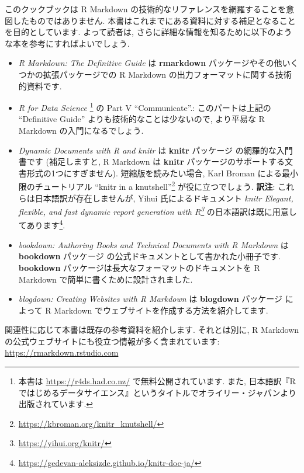 \documentclass[
  11pt,
  lualatex,ja=standard,jafont=noto]{bxjsreport}
\renewcommand{\href}[2]{#2\footnote{\url{#1}}}
\begin{document}
このクックブックは R Markdown の技術的なリファレンスを網羅することを意図したものではありません. 本書はこれまでにある資料に対する補足となることを目的としています. よって読者は, さらに詳細な情報を知るために以下のような本を参考にすればよいでしょう.

\begin{itemize}
\item
  \emph{R Markdown: The Definitive Guide} \autocite{rmarkdown2018} は \textbf{rmarkdown} パッケージやその他いくつかの拡張パッケージでの R Markdown の出力フォーマットに関する技術的資料です.
\item
  \emph{R for Data Science} \autocite{wickham2016Data}\footnote{本書は \url{https://r4ds.had.co.nz/} で無料公開されています. また, 日本語訳『Rではじめるデータサイエンス』というタイトルでオライリー・ジャパンより出版されています.} の Part V ``Communicate''.: このパートは上記の ``Definitive Guide'' よりも技術的なことは少ないので, より平易な R Markdown の入門になるでしょう.
\item
  \emph{Dynamic Documents with R and knitr} \autocite{knitr2015} は \textbf{knitr} パッケージ \autocite{R-knitr} の網羅的な入門書です (補足しますと, R Markdown は \textbf{knitr} パッケージのサポートする文書形式の1つにすぎません). 短縮版を読みたい場合, Karl Broman による最小限のチュートリアル \href{https://kbroman.org/knitr_knutshell/}{``knitr in a knutshell''} が役に立つでしょう. \textbf{訳注}: これらは日本語訳が存在しませんが, Yihui 氏によるドキュメント \emph{\href{https://yihui.org/knitr/}{knitr Elegant, flexible, and fast dynamic report generation with R}} の日本語訳は既に用意してあります\footnote{\url{https://gedevan-aleksizde.github.io/knitr-doc-ja/}}.
\item
  \emph{bookdown: Authoring Books and Technical Documents with R Markdown} \autocite{bookdown2016} は \textbf{bookdown} パッケージ \autocite{R-bookdown} の公式ドキュメントとして書かれた小冊子です. \textbf{bookdown} パッケージは長大なフォーマットのドキュメントを R Markdown で簡単に書くために設計されました.
\item
  \emph{blogdown: Creating Websites with R Markdown} \autocite{blogdown2017} は \textbf{blogdown} パッケージ \autocite{R-blogdown} によって R Markdown でウェブサイトを作成する方法を紹介してます.
\end{itemize}

関連性に応じて本書は既存の参考資料を紹介します. それとは別に, R Markdown の公式ウェブサイトにも役立つ情報が多く含まれています: \url{https://rmarkdown.rstudio.com}
\end{document}
